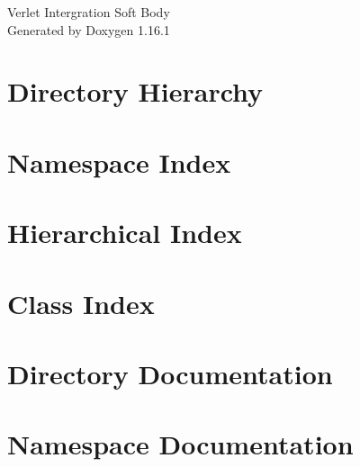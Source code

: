 \documentclass[twoside]{book}
\newcommand{\+}{\discretionary{\mbox{\scriptsize$\hookleftarrow$}}{}{}}
\newcommand{\clearemptydoublepage}{%
    \newpage{\pagestyle{empty}\cleardoublepage}%
  }
\begin{document}
  \raggedbottom
    \hypersetup{pageanchor=false,
                bookmarksnumbered=true,
                pdfencoding=unicode
               }
  \begin{titlepage}
  \vspace*{7cm}
  \begin{center}%
  {\Large Verlet Intergration Soft Body}\\
  \vspace*{1cm}
  {\large Generated by Doxygen 1.16.1}\\
  \end{center}
  \end{titlepage}
  \clearemptydoublepage
  \tableofcontents
  \clearemptydoublepage
  \hypersetup{pageanchor=true}
\chapter{Directory Hierarchy}

\chapter{Namespace Index}

\chapter{Hierarchical Index}

\chapter{Class Index}

\chapter{Directory Documentation}

\chapter{Namespace Documentation}


\end{document}

